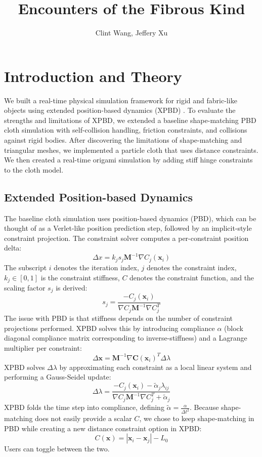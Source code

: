 \documentclass{article}
\title{Encounters of the Fibrous Kind}
\author{Clint Wang, Jeffery Xu}
\begin{document}
\maketitle

\section{Introduction and Theory}

We built a real-time physical simulation framework for rigid and fabric-like objects using extended position-based dynamics (XPBD) \cite{Macklin:2016:XPS:2994258.2994272}. To evaluate the strengths and limitations of XPBD, we extended a baseline shape-matching PBD cloth simulation with self-collision handling, friction constraints, and collisions against rigid bodies. After discovering the limitations of shape-matching and triangular meshes, we implemented a particle cloth that uses distance constraints. We then created a real-time origami simulation by adding stiff hinge constraints to the cloth model. 

\subsection{Extended Position-based Dynamics}
The baseline cloth simulation uses position-based dynamics (PBD), which can be thought of as a Verlet-like position prediction step, followed by an implicit-style constraint projection. The constraint solver computes a per-constraint position delta:
\[\Delta x = k_js_j\textbf{M}^{-1}\nabla C_j(\textbf{x}_i)\]
The subscript $i$ denotes the iteration index, $j$ denotes the constraint index, $k_j \in [0, 1]$ is the constraint stiffness, $C$ denotes the constraint function, and the scaling factor $s_j$ is derived:
\[s_j = \frac{-C_j(\textbf{x}_i)}{\nabla C_j\textbf{M}^{-1}\nabla C_j^T}\]
The issue with PBD is that stiffness depends on the number of constraint projections performed. XPBD solves this by introducing compliance $\alpha$ (block diagonal compliance matrix corresponding to inverse-stiffness) and a Lagrange multiplier per constraint:
\[\Delta \textbf{x} = \textbf{M}^{-1}\nabla \textbf{C}(\textbf{x}_i)^T \Delta \lambda\]
XPBD solves $\Delta \lambda $ by approximating each constraint as a local linear system and performing a Gauss-Seidel update:
\[\Delta \lambda = \frac{-C_j(\textbf{x}_i)-\tilde\alpha_j\lambda_{ij}}{\nabla C_j \textbf{M}^{-1}\nabla C_j^T + \tilde\alpha_j}\]
XPBD folds the time step into compliance, defining $\tilde\alpha = \frac{\alpha}{\Delta t^2}$. Because shape-matching does not easily provide a scalar $C$, we chose to keep shape-matching in PBD while creating a new distance constraint option in XPBD:
\[C(\textbf{x}) = |\textbf{x}_i - \textbf{x}_j| - L_0\]
Users can toggle between the two. 
\end{document}
